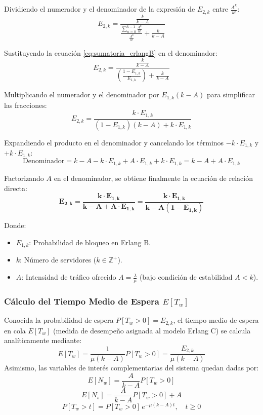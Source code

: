 \documentclass[11pt, a4paper]{article}
\begin{document}
Dividiendo el numerador y el denominador de la expresión de $E_{2,k}$ entre $\frac{A^k}{k!}$:
\[
E_{2,k} = \frac{\frac{k}{k - A}}{\frac{\sum\limits_{n=0}^{k-1} \frac{A^n}{n!}}{\frac{A^k}{k!}} + \frac{k}{k - A}}
\]

Sustituyendo la ecuación \eqref{eq:sumatoria_erlangB} en el denominador:
\[
E_{2,k} = \frac{\frac{k}{k - A}}{\left(\frac{1 - E_{1,k}}{E_{1,k}}\right) + \frac{k}{k - A}}
\]

Multiplicando el numerador y el denominador por $E_{1,k}(k - A)$ para simplificar las fracciones:
\[
E_{2,k} = \frac{k \cdot E_{1,k}}{(1 - E_{1,k})(k - A) + k \cdot E_{1,k}}
\]

Expandiendo el producto en el denominador y cancelando los términos $-k \cdot E_{1,k}$ y $+k \cdot E_{1,k}$:
\[
\text{Denominador} = k - A - k \cdot E_{1,k} + A \cdot E_{1,k} + k \cdot E_{1,k} = k - A + A \cdot E_{1,k}
\]

Factorizando $A$ en el denominador, se obtiene finalmente la ecuación de relación directa:
\begin{equation}
\mathbf{E_{2,k} = \frac{k \cdot E_{1,k}}{k - A + A \cdot E_{1,k}} = \frac{k \cdot E_{1,k}}{k - A(1 - E_{1,k})}}
\label{eq:erlangC_directa}
\end{equation}

Donde:
\begin{itemize}
    \item $E_{1,k}$: Probabilidad de bloqueo en Erlang B.
    \item $k$: Número de servidores ($k \in \mathbb{Z}^+$).
    \item $A$: Intensidad de tráfico ofrecido $A = \frac{\lambda}{\mu}$ (bajo condición de estabilidad $A < k$).
\end{itemize}

\subsubsection{Cálculo del Tiempo Medio de Espera $E[T_w]$}
Conocida la probabilidad de espera $P[T_w > 0] = E_{2,k}$, el tiempo medio de espera en cola $E[T_w]$ (medida de desempeño asignada al modelo Erlang C) se calcula analíticamente mediante:
\begin{equation}
E[T_w] = \frac{1}{\mu(k - A)} P[T_w > 0] = \frac{E_{2,k}}{\mu(k - A)}
\label{eq:ETw_teorico}
\end{equation}
Asimismo, las variables de interés complementarias del sistema quedan dadas por:
\begin{equation}
E[N_w] = \frac{A}{k - A} P[T_w > 0]
\end{equation}
\begin{equation}
E[N_s] = \frac{A}{k - A} P[T_w > 0] + A
\end{equation}
\begin{equation}
P[T_w > t] = P[T_w > 0] \, e^{-\mu(k - A)t}, \quad t \ge 0
\end{equation}
\end{document}
